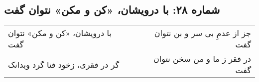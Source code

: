 \begin{center}
\section*{شماره ۲۸: با درویشان، «کن و مکن» نتوان گفت}
\label{sec:028}
\begin{longtable}{l p{0.5cm} r}
با درویشان، «کن و مکن» نتوان گفت
&&
جز از عدمِ بی سر و بن نتوان گفت
\\
گر در فقری، زخود فنا گرد وبدانک
&&
در فقر ز ما و من سخن نتوان گفت
\\
\end{longtable}
\end{center}

